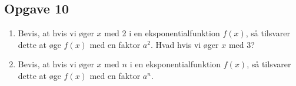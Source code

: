 \subsection*{Opgave 10}
\begin{enumerate}[label=\roman*)]
\item Bevis, at hvis vi øger $x$ med 2 i en eksponentialfunktion $f(x)$, så tilsvarer dette at øge $f(x)$ med en faktor $a^2$. Hvad hvis vi øger $x$ med $3$?
\item Bevis, at hvis vi øger $x$ med $n$ i en eksponentialfunktion $f(x)$, så tilsvarer dette at øge $f(x)$ med en faktor $a^n$.
\end{enumerate}